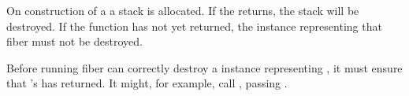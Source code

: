 \label{destruction}

On construction of a \fiber a stack is allocated. If the \entryfn returns,
the stack will be destroyed. If the function has not yet returned,
the \fiber instance representing that fiber must not be destroyed.


Before running fiber  can correctly destroy a \fiber instance
representing , it must ensure that 's \entryfn has returned.
It might, for example, call \resumewith, passing \unwindfib.



